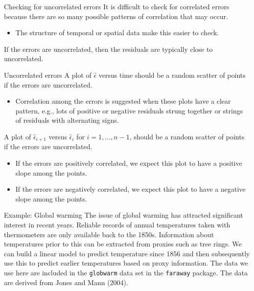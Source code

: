 \begin{frame}{Checking for uncorrelated errors}
\protect\hypertarget{checking-for-uncorrelated-errors}{}
It is difficult to check for correlated errors because there are so many
possible patterns of correlation that may occur.

\begin{itemize}
\tightlist
\item
  The structure of temporal or spatial data make this easier to check.
\end{itemize}

If the errors are uncorrelated, then the residuals are typically close
to uncorrelated.
\end{frame}

\begin{frame}{Uncorrelated errors}
\protect\hypertarget{uncorrelated-errors}{}
A plot of \(\hat{\epsilon}\) versus time should be a random scatter of
points if the errors are uncorrelated.

\begin{itemize}
\tightlist
\item
  Correlation among the errors is suggested when these plots have a
  clear pattern, e.g., lots of positive or negative residuals strung
  together or strings of residuals with alternating signs.
\end{itemize}

A plot of \(\hat{\epsilon}_{i+1}\) versus \(\hat{\epsilon}_i\) for
\(i=1,\dots,n-1\), should be a random scatter of points if the errors
are uncorrelated.

\begin{itemize}
\tightlist
\item
  If the errors are positively correlated, we expect this plot to have a
  positive slope among the points.
\item
  If the errors are negatively correlated, we expect this plot to have a
  negative slope among the points.
\end{itemize}
\end{frame}

\begin{frame}[fragile]{Example: Global warming}
\protect\hypertarget{example-global-warming}{}
The issue of global warming has attracted significant interest in recent
years. Reliable records of annual temperatures taken with thermometers
are only available back to the 1850s. Information about temperatures
prior to this can be extracted from proxies such as tree rings. We can
build a linear model to predict temperature since 1856 and then
subsequently use this to predict earlier temperatures based on proxy
information. The data we use here are included in the \texttt{globwarm}
data set in the \texttt{faraway} package. The data are derived from
Jones and Mann (2004).
\end{frame}


